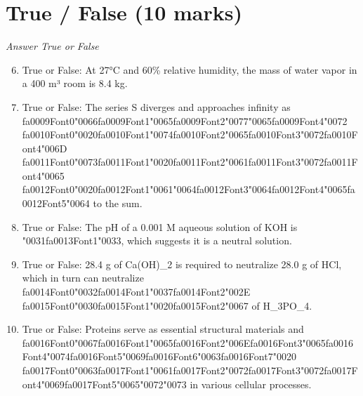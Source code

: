 \documentclass[12pt]{article}
\begin{document}
\section*{True / False (10 marks)}
\textit{Answer True or False}
\begin{enumerate}[label=\arabic*.]
\setcounter{enumi}{5}
\item True or False: At 27°C and 60\% relative humidity, the mass of water vapor in a 400 m³ room is 8.4 kg.
\item True or False: The series S diverges and approaches infinity as {\csname fa0009Font0\endcsname\char"0066}{\csname fa0009Font1\endcsname\char"0065}{\csname fa0009Font2\endcsname\char"0077}{\char"0065}{\csname fa0009Font4\endcsname\char"0072} {\csname fa0010Font0\endcsname\char"0020}{\csname fa0010Font1\endcsname\char"0074}{\csname fa0010Font2\endcsname\char"0065}{\csname fa0010Font3\endcsname\char"0072}{\csname fa0010Font4\endcsname\char"006D} {\csname fa0011Font0\endcsname\char"0073}{\csname fa0011Font1\endcsname\char"0020}{\csname fa0011Font2\endcsname\char"0061}{\csname fa0011Font3\endcsname\char"0072}{\csname fa0011Font4\endcsname\char"0065} {\csname fa0012Font0\endcsname\char"0020}{\csname fa0012Font1\endcsname\char"0061}{\char"0064}{\csname fa0012Font3\endcsname\char"0064}{\csname fa0012Font4\endcsname\char"0065}{\csname fa0012Font5\endcsname\char"0064} to the sum.
\item True or False: The pH of a 0.001 M aqueous solution of KOH is {\char"0031}{\csname fa0013Font1\endcsname\char"0033}, which suggests it is a neutral solution.
\item True or False: 28.4 g of Ca(OH)\_2 is required to neutralize 28.0 g of HCl, which in turn can neutralize {\csname fa0014Font0\endcsname\char"0032}{\csname fa0014Font1\endcsname\char"0037}{\csname fa0014Font2\endcsname\char"002E} {\csname fa0015Font0\endcsname\char"0030}{\csname fa0015Font1\endcsname\char"0020}{\csname fa0015Font2\endcsname\char"0067} of H\_3PO\_4.
\item True or False: Proteins serve as essential structural materials and {\csname fa0016Font0\endcsname\char"0067}{\csname fa0016Font1\endcsname\char"0065}{\csname fa0016Font2\endcsname\char"006E}{\csname fa0016Font3\endcsname\char"0065}{\csname fa0016Font4\endcsname\char"0074}{\csname fa0016Font5\endcsname\char"0069}{\csname fa0016Font6\endcsname\char"0063}{\csname fa0016Font7\endcsname\char"0020} {\csname fa0017Font0\endcsname\char"0063}{\csname fa0017Font1\endcsname\char"0061}{\csname fa0017Font2\endcsname\char"0072}{\csname fa0017Font3\endcsname\char"0072}{\csname fa0017Font4\endcsname\char"0069}{\csname fa0017Font5\endcsname\char"0065}{\char"0072}{\char"0073} in various cellular processes.
\end{enumerate}
\end{document}
